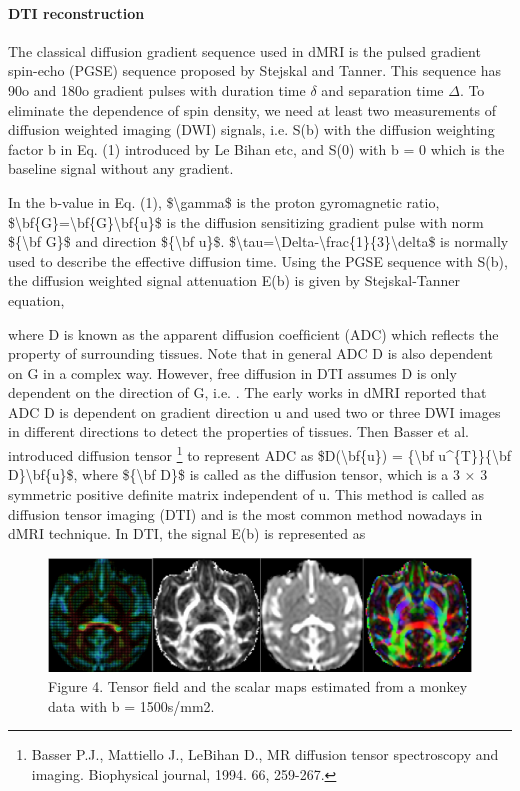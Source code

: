 \documentclass[letterpaper,10pt,english]{sphinxmanual}
\begin{document}
\paragraph{DTI reconstruction}
\label{userguide:dti-reconstruction}
The classical diffusion gradient sequence used in dMRI is the pulsed gradient spin-echo (PGSE) sequence proposed by Stejskal and Tanner. This sequence has 90o and 180o gradient pulses with duration time \(\delta\) and separation time \(\Delta\). To eliminate the dependence of spin density, we need at least two measurements of diffusion weighted imaging (DWI) signals, i.e. S(b) with the diffusion weighting factor b in Eq. (1) introduced by Le Bihan etc, and S(0) with b = 0 which is the baseline signal without any gradient.

In the b-value in Eq. (1), \$\textbackslash{}gamma\$ is the proton gyromagnetic ratio, \$\textbackslash{}bf\{G\}=\textbar{}\textbar{}\textbackslash{}bf\{G\}\textbar{}\textbar{}\textbackslash{}bf\{u\}\$ is the diffusion sensitizing gradient pulse with norm \$\textbar{}\textbar{}\{\textbackslash{}bf G\}\textbar{}\textbar{}\$ and direction \$\{\textbackslash{}bf u\}\$. \$\textbackslash{}tau=\textbackslash{}Delta-\textbackslash{}frac\{1\}\{3\}\textbackslash{}delta\$ is normally used to describe the effective diffusion time. Using the PGSE sequence with S(b), the diffusion weighted signal attenuation E(b) is given by Stejskal-Tanner equation,

where D is known as the apparent diffusion coefﬁcient (ADC) which reﬂects the property of surrounding tissues. Note that in general ADC D is also dependent on G in a complex way. However, free diffusion in DTI assumes D is only dependent on the direction of G, i.e. . The early works in dMRI reported that ADC D is dependent on gradient direction u and used two or three DWI images in different directions to detect the properties of tissues. Then Basser et al. introduced diffusion tensor \footnote{
Basser P.J., Mattiello J., LeBihan D., MR diffusion tensor spectroscopy and imaging. Biophysical journal, 1994. 66, 259-267.
} to represent ADC as \$D(\textbackslash{}bf\{u\}) = \{\textbackslash{}bf u\textasciicircum{}\{T\}\}\{\textbackslash{}bf D\}\textbackslash{}bf\{u\}\$, where \$\{\textbackslash{}bf D\}\$ is called as the diffusion tensor, which is a 3 × 3 symmetric positive deﬁnite matrix independent of u. This method is called as diffusion tensor imaging (DTI) and is the most common method nowadays in dMRI technique. In DTI, the signal E(b) is represented as
\begin{figure}[htbp]
\centering
\capstart

\includegraphics{scalarmaps.png}
\caption{Figure 4. Tensor field and the scalar maps estimated from a monkey data with b = 1500s/mm2.}\end{figure}
\end{document}
